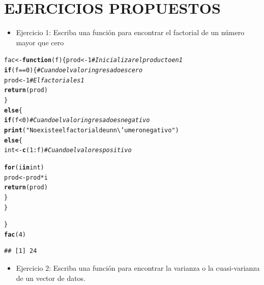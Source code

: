 \documentclass[12pt,letterpaper]{article}\usepackage[]{graphicx}\usepackage[]{color}
\makeatletter
\newcommand{\hlnum}[1]{\textcolor[rgb]{0.686,0.059,0.569}{#1}}%
\newcommand{\hlstr}[1]{\textcolor[rgb]{0.192,0.494,0.8}{#1}}%
\newcommand{\hlcom}[1]{\textcolor[rgb]{0.678,0.584,0.686}{\textit{#1}}}%
\newcommand{\hlopt}[1]{\textcolor[rgb]{0,0,0}{#1}}%
\newcommand{\hlstd}[1]{\textcolor[rgb]{0.345,0.345,0.345}{#1}}%
\newcommand{\hlkwa}[1]{\textcolor[rgb]{0.161,0.373,0.58}{\textbf{#1}}}%
\newcommand{\hlkwb}[1]{\textcolor[rgb]{0.69,0.353,0.396}{#1}}%
\newcommand{\hlkwc}[1]{\textcolor[rgb]{0.333,0.667,0.333}{#1}}%
\newcommand{\hlkwd}[1]{\textcolor[rgb]{0.737,0.353,0.396}{\textbf{#1}}}%
\newenvironment{kframe}{%
 \def\at@end@of@kframe{}%
 \ifinner\ifhmode%
  \def\at@end@of@kframe{\end{minipage}}%
  \begin{minipage}{\columnwidth}%
 \fi\fi%
 \def\FrameCommand##1{\hskip\@totalleftmargin \hskip-\fboxsep
 \colorbox{shadecolor}{##1}\hskip-\fboxsep
     \hskip-\linewidth \hskip-\@totalleftmargin \hskip\columnwidth}%
 \MakeFramed {\advance\hsize-\width
   \@totalleftmargin\z@ \linewidth\hsize
   \@setminipage}}%
 {\par\unskip\endMakeFramed%
 \at@end@of@kframe}
\newenvironment{knitrout}{}{} %
\makeatother
\begin{document}
\section{EJERCICIOS PROPUESTOS}
\begin{itemize}
\item Ejercicio 1: Escriba una funci\'on para encontrar el factorial de un n\'umero mayor que cero
\end{itemize}
\begin{knitrout}
\color{fgcolor}\begin{kframe}
\begin{alltt}
\hlstd{fac}\hlkwb{<-}\hlkwa{function}\hlstd{(}\hlkwc{f}\hlstd{)\{ prod}\hlkwb{<-}\hlnum{1} \hlcom{# Inicializar el producto en 1}
\hlkwa{if} \hlstd{(f}\hlopt{==}\hlnum{0}\hlstd{)\{} \hlcom{# Cuando el valor ingresado es cero}
  \hlstd{prod}\hlkwb{<-}\hlnum{1} \hlcom{# El factorial es 1}
  \hlkwd{return}\hlstd{(prod)}
\hlstd{\}}
  \hlkwa{else}\hlstd{\{}
    \hlkwa{if}\hlstd{(f}\hlopt{<}\hlnum{0}\hlstd{)} \hlcom{# Cuando el valor ingresado es negativo}
      \hlkwd{print}\hlstd{(}\hlstr{"No existe el factorial de un n\textbackslash{}'umero negativo"}\hlstd{)}
    \hlkwa{else} \hlstd{\{}
      \hlstd{int}\hlkwb{<-}\hlkwd{c}\hlstd{(}\hlnum{1}\hlopt{:}\hlstd{f)} \hlcom{# Cuando el valor es positivo}

      \hlkwa{for}\hlstd{(i} \hlkwa{in} \hlstd{int)}
        \hlstd{prod}\hlkwb{<-}\hlstd{prod} \hlopt{*} \hlstd{i}
      \hlkwd{return}\hlstd{(prod)}
    \hlstd{\}}
  \hlstd{\}}

  \hlstd{\}}
\hlkwd{fac}\hlstd{(}\hlnum{4}\hlstd{)}
\end{alltt}
\begin{verbatim}
## [1] 24
\end{verbatim}
\end{kframe}
\end{knitrout}
\begin{itemize}
\item Ejercicio 2: Escriba una funci\'on para encontrar la varianza o la cuasi-varianza de un vector de
datos.
\end{itemize}
\end{document}
